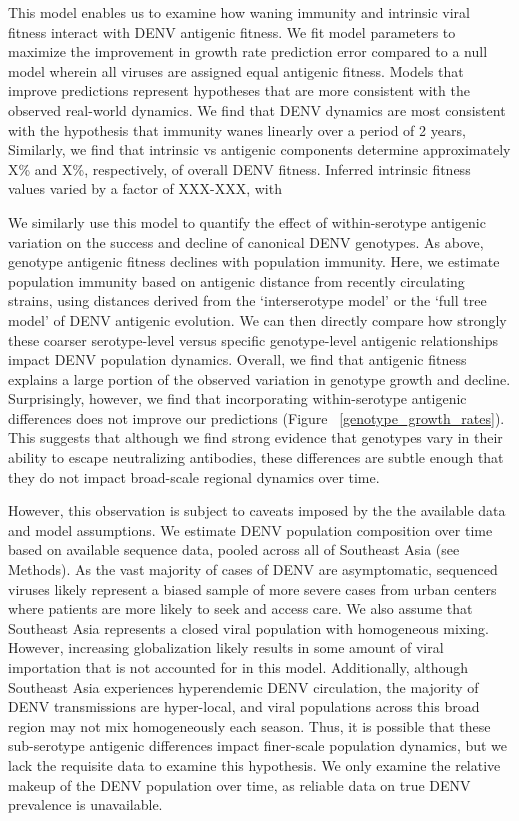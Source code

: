 \documentclass[11pt,oneside,letterpaper]{article}
\begin{document}
This model enables us to examine how waning immunity and intrinsic viral fitness interact with DENV antigenic fitness.
We fit model parameters to maximize the improvement in growth rate prediction error compared to a null model wherein all viruses are assigned equal antigenic fitness.
Models that improve predictions represent hypotheses that are more consistent with the observed real-world dynamics.
We find that DENV dynamics are most consistent with the hypothesis that immunity wanes linearly over a period of 2 years, %
Similarly, we find that intrinsic vs antigenic components determine approximately X\% and X\%, respectively, of overall DENV fitness.
Inferred intrinsic fitness values varied by a factor of XXX-XXX, with %

We similarly use this model to quantify the effect of within-serotype antigenic variation on the success and decline of canonical DENV genotypes.
As above, genotype antigenic fitness declines with population immunity.
Here, we estimate population immunity based on antigenic distance from recently circulating strains, using distances derived from the `interserotype model' or the `full tree model' of DENV antigenic evolution.
We can then directly compare how strongly these coarser serotype-level versus specific genotype-level antigenic relationships impact DENV population dynamics.
Overall, we find that antigenic fitness explains a large portion of the observed variation in genotype growth and decline.
Surprisingly, however, we find that incorporating within-serotype antigenic differences does not improve our predictions (Figure ~\ref{genotype_growth_rates}).
This suggests that although we find strong evidence that genotypes vary in their ability to escape neutralizing antibodies, these differences are subtle enough that they do not impact broad-scale regional dynamics over time.

However, this observation is subject to caveats imposed by the the available data and model assumptions.
We estimate DENV population composition over time based on available sequence data, pooled across all of Southeast Asia (see Methods).
As the vast majority of cases of DENV are asymptomatic, sequenced viruses likely represent a biased sample of more severe cases from urban centers where patients are more likely to seek and access care.
We also assume that Southeast Asia represents a closed viral population with homogeneous mixing.
However, increasing globalization likely results in some amount of viral importation that is not accounted for in this model.
Additionally, although Southeast Asia experiences hyperendemic DENV circulation, the majority of DENV transmissions are hyper-local, and viral populations across this broad region may not mix homogeneously each season.
Thus, it is possible that these sub-serotype antigenic differences impact finer-scale population dynamics, but we lack the requisite data to examine this hypothesis.
We only examine the relative makeup of the DENV population over time, as reliable data on true DENV prevalence is unavailable.
\end{document}
